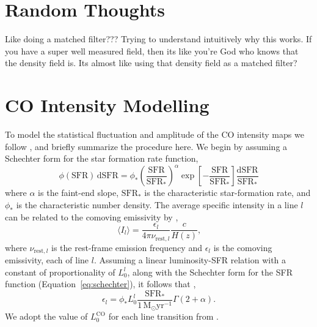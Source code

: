 \documentclass{aastex62}
\newcommand{\Msun}{\ensuremath{\text{M}_\odot}}
\newcommand{\SFR}{\ensuremath{\text{SFR}}}
\newcommand{\CO}{\ensuremath{\text{CO}}}
\newcommand{\beq}{\begin{equation}}
\newcommand{\eeq}{\end{equation}}
\newcommand{\avg}[1]{\ensuremath{\langle #1 \rangle}}
\begin{document}
\section{Random Thoughts}
Like doing a matched filter??? Trying to understand intuitively why this
works. If you have a super well measured field, then its like you're God who
knows that the density field is. Its almost like using that density field as a
matched filter?

\appendix
\section{CO Intensity Modelling} \label{app:co_int}
To model the statistical fluctuation and amplitude of the \CO{} intensity maps
we follow \citet{2016ApJ...825..143L}, and briefly summarize the procedure
here. We begin by assuming a Schechter form for the star formation rate
function,
\beq\label{eq:schechter}
\phi(\SFR)\,\text{d}\SFR = \phi_*
\left(\frac{\SFR}{\SFR_*}\right)^{\alpha}\exp{\left[-\frac{\SFR}{\SFR_*}\right]}
\frac{\text{d}\SFR}{\SFR_*}
\eeq
where $\alpha$ is the faint-end slope, $\SFR_*$ is the characteristic
star-formation rate, and $\phi_*$ is the characteristic number density. The
average specific intensity in a line $l$ can be related to the comoving
emissivity by \citep{2011ApJ...741...70L, 2013ApJ...768...15P},
\beq\label{eq:emiss_to_int}
\avg{I_l} = \frac{\epsilon_l}{4\pi \nu_{\text{rest},l}}\frac{c}{H(z)}\text{,}
\eeq
where $\nu_{\text{rest},l}$ is the rest-frame emission frequency and
$\epsilon_l$ is the comoving emissivity, each of line $l$. Assuming a linear
luminosity-SFR relation with a constant of proportionality of $L_0^l$, along
with the Schechter form for the SFR function (Equation~\ref{eq:schechter}), it
follows that \citep{2013ApJ...768...15P},
\beq\label{eq:com_emiss}
\epsilon_l = \phi_* L_0^{l}
\frac{\SFR_*}{1\,\Msun\text{yr}^{-1}}\Gamma{(2+\alpha)}\text{.}
\eeq
We adopt the value of $L_0^{\CO}$ for each line transition from
\citet{2010JCAP...11..016V}.



\end{document}
